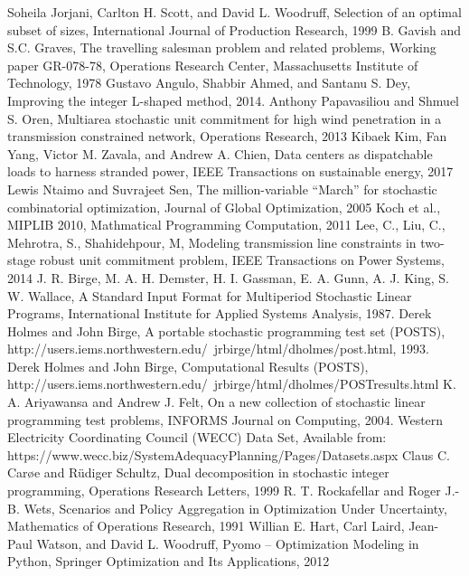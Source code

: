 \begin{thebibliography}{9}
	Soheila Jorjani, Carlton H. Scott, and David L. Woodruff, Selection of an optimal subset of sizes, International Journal of Production Research, 1999	
	B. Gavish and S.C. Graves, The travelling salesman problem and related problems, Working paper GR-078-78, Operations Research Center, Massachusetts Institute of Technology, 1978
	Gustavo Angulo, Shabbir Ahmed, and Santanu S. Dey, Improving the integer L-shaped method, 2014.
	Anthony Papavasiliou and Shmuel S. Oren, Multiarea stochastic unit commitment for high wind penetration in a transmission constrained network, Operations Research, 2013
	Kibaek Kim, Fan Yang, Victor M. Zavala, and Andrew A. Chien, Data centers as dispatchable loads to harness stranded power, IEEE Transactions on sustainable energy, 2017
	Lewis Ntaimo and Suvrajeet Sen, The million-variable ``March'' for stochastic combinatorial optimization, Journal of Global Optimization, 2005
	Koch et al., MIPLIB 2010, Mathmatical Programming Computation, 2011
	Lee, C., Liu, C., Mehrotra, S., Shahidehpour, M, Modeling transmission line constraints in two-stage robust unit commitment problem, IEEE Transactions on Power Systems, 2014
	J. R. Birge, M. A. H. Demster, H. I. Gassman, E. A. Gunn, A. J. King, S. W. Wallace, A Standard Input Format for Multiperiod Stochastic Linear Programs, International Institute for Applied Systems Analysis, 1987.
	Derek Holmes and John Birge, A portable stochastic programming test set (POSTS), http://users.iems.northwestern.edu/~jrbirge/html/dholmes/post.html, 1993.
	Derek Holmes and John Birge, Computational Results (POSTS), http://users.iems.northwestern.edu/~jrbirge/html/dholmes/POSTresults.html
	K. A. Ariyawansa and Andrew J. Felt, On a new collection of stochastic linear programming test problems, INFORMS Journal on Computing, 2004.
    Western Electricity Coordinating Council (WECC) Data Set, Available from: https://www.wecc.biz/SystemAdequacyPlanning/Pages/Datasets.aspx 
    Claus C. Car\o e and Rüdiger Schultz, Dual decomposition in stochastic integer programming, Operations Research Letters, 1999
    R. T. Rockafellar and Roger J.-B. Wets, Scenarios and Policy Aggregation in Optimization Under Uncertainty, Mathematics of Operations Research, 1991
    Willian E. Hart, Carl Laird, Jean-Paul Watson, and David L. Woodruff, Pyomo – Optimization Modeling in Python, Springer Optimization and Its Applications, 2012

\end{thebibliography}
